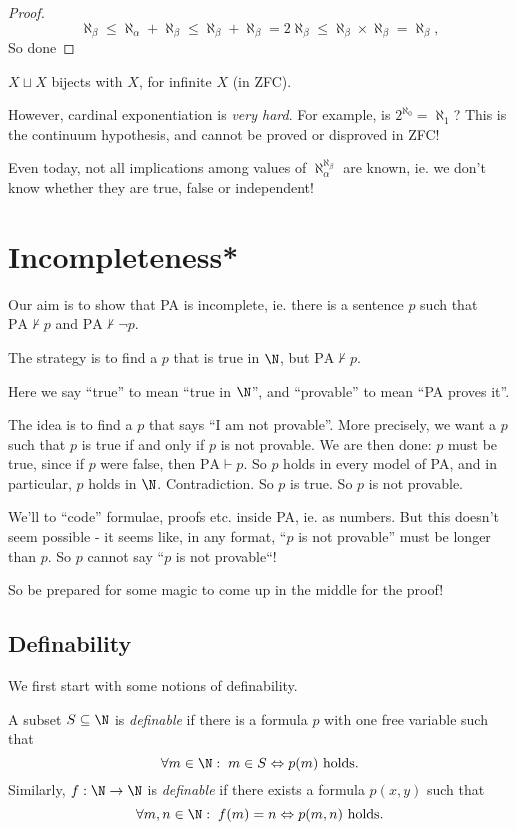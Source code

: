 \documentclass[a4paper]{article}
\begin{document}
\begin{proof}
  \[
    \aleph_\beta \leq \aleph_\alpha + \aleph_\beta \leq \aleph_\beta + \aleph_\beta = 2\aleph_\beta \leq \aleph_\beta\times \aleph_\beta = \aleph_\beta,
  \]
  So done
\end{proof}

\begin{eg}
  $X\sqcup X$ bijects with $X$, for infinite $X$ (in ZFC).
\end{eg}

However, cardinal exponentiation is \emph{very hard}. For example, is $2^{\aleph_0} = \aleph_1$? This is the continuum hypothesis, and cannot be proved or disproved in ZFC!

Even today, not all implications among values of $\aleph_\alpha^{\aleph_\beta}$ are known, ie. we don't know whether they are true, false or independent!
\section{Incompleteness*}
Our aim is to show that PA is incomplete, ie. there is a sentence $p$ such that $\mathrm{PA}\not\vdash p$ and $\mathrm{PA}\not\vdash \neg p$.

The strategy is to find a  $p$ that is true in $\N$, but $\mathrm{PA}\not\vdash p$.

Here we say ``true'' to mean ``true in $\N$'', and ``provable'' to mean ``PA proves it''.

The idea is to find a $p$ that says ``I am not provable''. More precisely, we want a $p$ such that $p$ is true if and only if $p$ is not provable. We are then done: $p$ must be true, since if $p$ were false, then $\mathrm{PA}\vdash p$. So $p$ holds in every model of PA, and in particular, $p$ holds in $\N$. Contradiction. So $p$ is true. So $p$ is not provable.

We'll to ``code'' formulae, proofs etc. inside PA, ie. as numbers. But this doesn't seem possible - it seems like, in any format, ``$p$ is not provable'' must be longer than $p$. So $p$ cannot say ``$p$ is not provable``!

So be prepared for some magic to come up in the middle for the proof!

\subsection*{Definability}
We first start with some notions of definability.

\begin{defi}[Definability]
  A subset $S\subseteq \N$ is \emph{definable} if there is a formula $p$ with one free variable such that
  \[
    \forall m\in \N:\; m\in S \Leftrightarrow p(m)\text{ holds}.
  \]
  Similarly, $f: \N \to \N$ is \emph{definable} if there exists a formula $p(x, y)$ such that
  \[
    \forall m, n\in \N:\; f(m) = n \Leftrightarrow p(m, n)\text{ holds}.
  \]
\end{defi}
\end{document}
